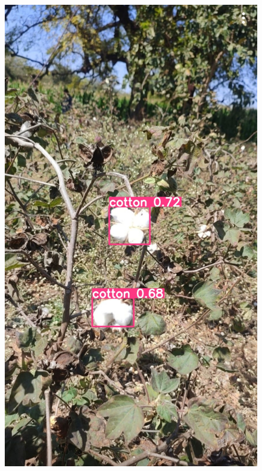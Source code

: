 \documentclass[12pt,a4paper]{report}
\begin{document}
\begin{figure}[H]
\begin{center}
\includegraphics[scale=0.2]{images/results/7.jpg.jpg}
\hspace{0.2in}

\end{center}
\end{figure}
\end{document}
